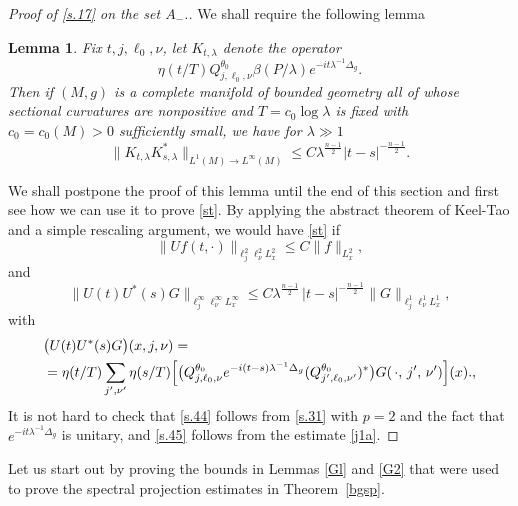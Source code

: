 \documentclass[10pt]{amsart}
\newtheorem{lemma}[theorem]{Lemma}
\newcommand{\la}{\lambda}
\newcommand{\1}{{\bf 1}}
\begin{document}
\begin{proof}[Proof of \eqref{s.17} on the set $A_-$.]
We shall require the following lemma
\begin{lemma}\label{kerprop1}  Fix $t, j,\ell_0,\nu$, let $K_{t,\la}$ denote  the operator 
$$\eta( t/T)Q^{\theta_0}_{j,\ell_0,\nu} \beta(P/\la)e^{-it\la^{-1}\Delta_g}.$$
Then if $(M,g)$ is a complete manifold of bounded geometry all of whose sectional curvatures are nonpositive and $T=c_0\log\la$ is fixed with $c_0=c_0(M)>0$ sufficiently small, we have for $\la\gg 1$
\begin{equation}\label{j1a}
\|K_{t,\la}K^*_{s,\la}\|_{L^1(M)\to L^\infty(M)}\le C\la^{\frac{n-1}2}|t-s|^{-\frac{n-1}2}.
\end{equation}
\end{lemma}
We shall postpone the proof of this lemma until the end of this section and first see
how we can use it to prove \eqref{st}.
By applying the abstract theorem of Keel-Tao \cite{KT} and a simple rescaling argument, 
 we 
would have \eqref{st} if
\begin{equation}\label{s.44}
\| Uf(t,\cdot)\|_{\ell^2_j\ell_\nu^{2}L^{2}_{x}}
\le C \|f\|_{L^2_x},
\end{equation}
and 
\begin{equation}\label{s.45}
\| U(t)U^*(s)G\|_{\ell^\infty_j\ell_\nu^{\infty}L^{\infty}_x}
\le  C\la^{\frac{n-1}2} \, |t-s|^{-\frac{n-1}2}  \|G\|_{\ell_j^1\ell_\nu^{1}L^{1}_x},
\end{equation}
with
\begin{align}\label{s.46}
&\big(U(t)U^*(s)G\big)(x,j,\nu)=
\\
&= \eta(t/T) \sum_{j', \nu'} 
 \eta(s/T) \Bigl[ \bigr( Q_{j,\ell_0, \nu}^{\theta_0} e^{-i(t-s)\la^{-1}\Delta_g} (Q^{\theta_0}_{j',\ell_0,\nu'})^* \bigr)G( \, \cdot ,\,j',\,\nu')\Bigr] (x)., \notag
\end{align}
It is not hard to check that \eqref{s.44} follows from  \eqref{s.31}  with $p=2$ and the fact that $e^{-it\la^{-1}\Delta_g}$ is unitary, and \eqref{s.45} follows from the estimate \eqref{j1a}.
\end{proof}






Let us start out by proving the bounds in Lemmas \ref{Gl} and \ref{G2} that were used to prove the spectral projection
estimates in Theorem~\ref{bgsp}. 
\end{document}
